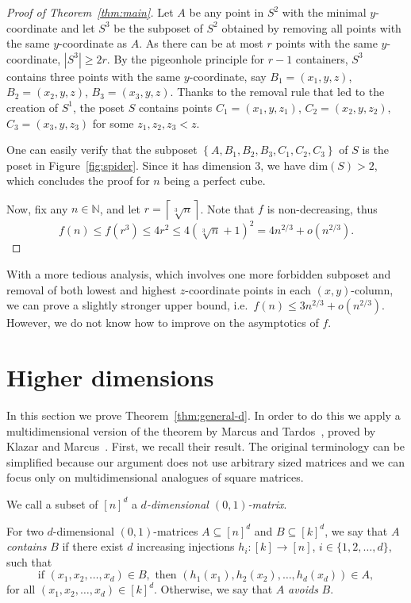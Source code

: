 \documentclass[a4paper,reqno,12pt]{amsart}
\theoremstyle{remark}
\theoremstyle{plain}
\theoremstyle{definition}
\newcommand{\set}[1]{\left\{#1\right\}}
\newcommand{\ceil}[1]{{\left\lceil #1 \right\rceil}}
\newcommand{\N}[0]{\mathbb{N}}
\newcommand{\pdim}[1]{\mathrm{dim}(#1)}
\let\leq\leqslant
\let\geq\geqslant
\let\subset\subseteq
\begin{document}
\begin{proof}[Proof of Theorem~\ref{thm:main}]
Let $A$ be any point in $S^2$ with the minimal $y$-coordinate
and let $S^3$ be the subposet of $S^2$ obtained by removing all points with the same
$y$-coordinate as $A$.
As there can be at most $r$ points with the same $y$-coordinate, $|S^3| \geq 2r$.
By the pigeonhole principle for $r-1$ containers,
$S^3$ contains three points with the same $y$-coordinate, say $B_1 = (x_1, y, z)$, $B_2 = (x_2, y, z)$, $B_3 = (x_3, y, z)$.
Thanks to the removal rule that led to the creation of $S^1$,
the poset $S$ contains points $C_1 = (x_1, y, z_1)$, $C_2 = (x_2, y, z_2)$, $C_3 = (x_3, y, z_3)$ for some $z_1,z_2,z_3 < z$.

  One can easily verify that the subposet $\set{A, B_1, B_2, B_3, C_1, C_2, C_3}$
  of $S$ is the poset in Figure~\ref{fig:spider}.
  Since it has dimension $3$, we have $\pdim{S} > 2$, which concludes the proof for $n$ being a perfect cube.

  Now, fix any $n \in \N$, and let $r = \ceil{\sqrt[3]{n}}$. Note that $f$ is
  non-decreasing, thus
  \[ f(n) \leq f(r^3) \leq 4r^2 \leq 4(\sqrt[3]{n} + 1)^2 =
     4n^{2/3} + o\left(n^{2/3}\right).\]
\end{proof}

With a more tedious analysis, which involves one more forbidden subposet
and removal of both lowest and highest $z$-coordinate
points in each $(x, y)$-column, we can prove a slightly stronger upper bound,
i.e.~$f(n) \leq 3n^{2/3} + o\left(n^{2/3}\right)$. However, we do not know how to
improve on the asymptotics of $f$.

\section{Higher dimensions}

In this section we prove Theorem~\ref{thm:general-d}.
In order to do this we apply a multidimensional version of the theorem by Marcus
and Tardos~\cite{Marcus2004}, proved by Klazar and Marcus~\cite{Klazar2007}.
First, we recall their result. The original terminology can be simplified because
our argument does not use arbitrary sized matrices and we can focus only on
multidimensional analogues of square matrices.

We call a subset of $[n]^d$ a \emph{$d$-dimensional $(0,1)$-matrix}.

For two $d$-dimensional $(0,1)$-matrices $A \subset [n]^d$ and
$B \subset [k]^d$, we say that $A$ \emph{contains} $B$ if there exist $d$
increasing injections $h_i : [k] \to [n]$, $i \in \{1, 2, \ldots, d\}$,
such that
\[
\text{if }(x_1, x_2, \ldots, x_d) \in B, \text{ then }
  (h_1(x_1), h_2(x_2), \ldots, h_d(x_d)) \in A,
\]
for all $(x_1, x_2, \ldots, x_d) \in [k]^d$.
Otherwise, we say that $A$ \emph{avoids} $B$.
\end{document}
